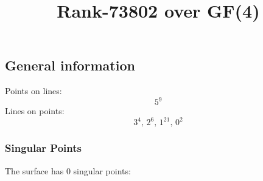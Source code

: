 \documentclass{article}
\newcommand\setTBstruts{\def\T{\rule{0pt}{2.6ex}}%
\def\B{\rule[-1.2ex]{0pt}{0pt}}}
\begin{document}
 
\setTBstruts



{\allowdisplaybreaks%






\title{Rank-73802 over GF(4)}
\author{}%
\maketitle%
%
{}



\subsection*{General information}
Points on lines:
$$
5^9$$
Lines on points:
$$
3^4,\,2^6,\,1^{21},\,0^2$$
\subsubsection*{Singular Points}
The surface has 0 singular points:\\
\begin{align*}
\end{align*}
}
\end{document}

